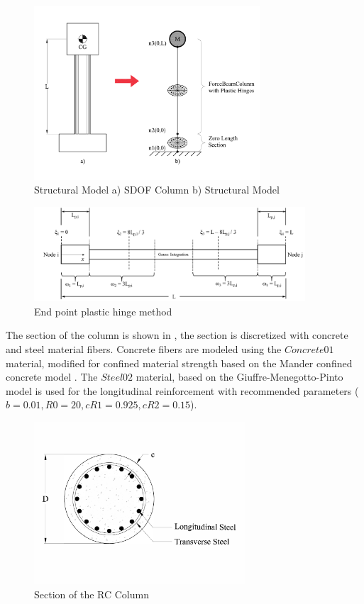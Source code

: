 \begin{figure}[htbp]
	\centering
	\includegraphics[width=0.75\textwidth]{Chapter-4/figs/StructuralModel_01}
	\caption{Structural Model a) SDOF Column b) Structural Model}
	\label{fig:Structural_Model}
\end{figure}

\begin{figure}[htbp]
	\centering
	\includegraphics[width=0.9\textwidth]{Chapter-4/figs/fbc_PlasticHinge}
	\caption{End point plastic hinge method \cite{Scott}}
	\label{fig:Fiber_PlasticHinge}
\end{figure}

The section of the column is shown in , the section is discretized with concrete and steel material fibers. Concrete fibers are modeled using the $Concrete01$ material, modified for confined material strength based on the Mander confined concrete model \cite{Mander1988}. The $Steel02$ material, based on the Giuffre-Menegotto-Pinto model \cite{Filippou1983} is used for the longitudinal reinforcement with recommended parameters ($b = 0.01, R0 = 20, cR1 = 0.925, cR2 = 0.15$). 

\begin{figure}[htbp]
	\centering
	\includegraphics[width=0.7\textwidth]{Chapter-4/figs/StructuralModel_Section}
	\caption{Section of the RC Column}
	\label{fig:ColumnSection}
\end{figure}
